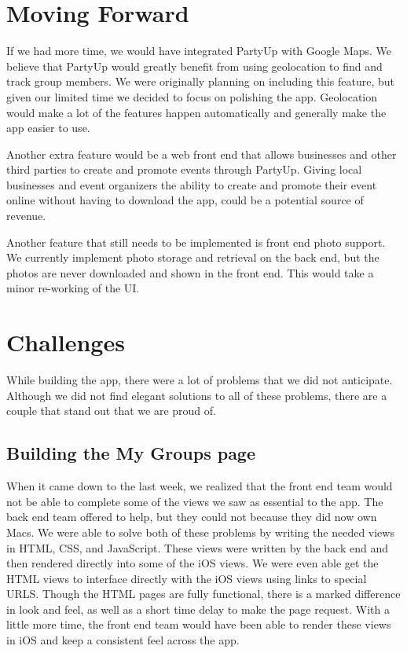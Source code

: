 \documentclass[12pt]{article}
\begin{document}
\section{Moving Forward}

If we had more time, we would have integrated PartyUp with Google Maps.
We believe that PartyUp would greatly benefit from using geolocation to find and track group members.
We were originally planning on including this feature, but given our limited time we decided to focus on polishing the app. 
Geolocation would make a lot of the features happen automatically and generally make the app easier to use. 

Another extra feature would be a web front end that allows businesses and other third parties to create and promote events through PartyUp.
Giving local businesses and event organizers the ability to create and promote their event online without having to download the app,
could be a potential source of revenue.

Another feature that still needs to be implemented is front end photo support.
We currently implement photo storage and retrieval on the back end, but the photos are never downloaded and shown in the front end.
This would take a minor re-working of the UI.

\section{Challenges}

While building the app, there were a lot of problems that we did not anticipate.
Although we did not find elegant solutions to all of these problems,
there are a couple that stand out that we are proud of.

\subsection{Building the My Groups page}

When it came down to the last week, we realized that the front end team would not be able to complete some of the views we saw as essential to the app. 
The back end team offered to help, but they could not because they did now own Macs.
We were able to solve both of these problems by writing the needed views in HTML, CSS, and JavaScript.
These views were written by the back end and then rendered directly into some of the iOS views. 
We were even able get the HTML views to interface directly with the iOS views using links to special URLS. 
Though the HTML pages are fully functional, there is a marked difference in look and feel, as well as a short time delay to make the page request. 
With a little more time, the front end team would have been able to render these views in iOS and keep a consistent feel across the app. 
\end{document}
